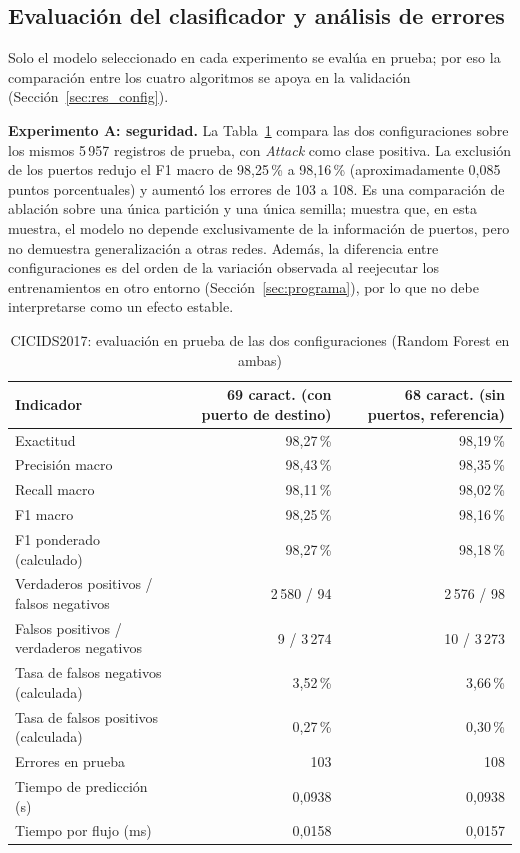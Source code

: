 \documentclass[conference]{IEEEtran}
\begin{document}
\subsection{Evaluación del clasificador y análisis de errores}
\label{sec:res_eval}

Solo el modelo seleccionado en cada experimento se evalúa en prueba; por eso la comparación entre los cuatro algoritmos se apoya en la validación (Sección~\ref{sec:res_config}).

\textbf{Experimento A: seguridad.} La Tabla~\ref{tab:ablacion_puerto} compara las dos configuraciones sobre los mismos 5\,957 registros de prueba, con \textit{Attack} como clase positiva. La exclusión de los puertos redujo el F1 macro de 98,25\,\% a 98,16\,\% (aproximadamente 0,085 puntos porcentuales) y aumentó los errores de 103 a 108. Es una comparación de ablación sobre una única partición y una única semilla; muestra que, en esta muestra, el modelo no depende exclusivamente de la información de puertos, pero no demuestra generalización a otras redes. Además, la diferencia entre configuraciones es del orden de la variación observada al reejecutar los entrenamientos en otro entorno (Sección~\ref{sec:programa}), por lo que no debe interpretarse como un efecto estable.

\begin{table}[!t]
\centering
\caption{CICIDS2017: evaluación en prueba de las dos configuraciones (Random Forest en ambas)}
\label{tab:ablacion_puerto}
\small
\begin{tabular}{lrr}
\toprule
\textbf{Indicador} & \textbf{69 caract. (con puerto de destino)} & \textbf{68 caract. (sin puertos, referencia)} \\
\midrule
Exactitud & 98,27\,\% & 98,19\,\% \\
Precisión macro & 98,43\,\% & 98,35\,\% \\
Recall macro & 98,11\,\% & 98,02\,\% \\
F1 macro & 98,25\,\% & 98,16\,\% \\
F1 ponderado (calculado) & 98,27\,\% & 98,18\,\% \\
Verdaderos positivos / falsos negativos & 2\,580 / 94 & 2\,576 / 98 \\
Falsos positivos / verdaderos negativos & 9 / 3\,274 & 10 / 3\,273 \\
Tasa de falsos negativos (calculada) & 3,52\,\% & 3,66\,\% \\
Tasa de falsos positivos (calculada) & 0,27\,\% & 0,30\,\% \\
Errores en prueba & 103 & 108 \\
Tiempo de predicción (s) & 0,0938 & 0,0938 \\
Tiempo por flujo (ms) & 0,0158 & 0,0157 \\
\bottomrule
\end{tabular}
\end{table}
\end{document}
